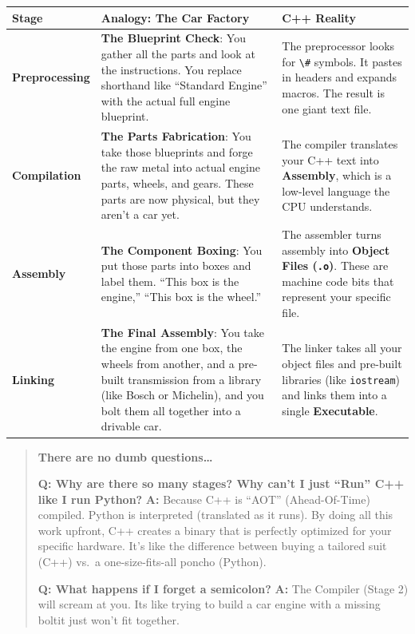 \begin{longtable}[]{@{}
  >{\raggedright\arraybackslash}p{}
  >{\raggedright\arraybackslash}p{}
  >{\raggedright\arraybackslash}p{}@{}}
\toprule
Stage & Analogy: The Car Factory & C++ Reality \\
\midrule
\endhead
\textbf{Preprocessing} & \textbf{The Blueprint Check}: You gather all
the parts and look at the instructions. You replace shorthand like
``Standard Engine'' with the actual full engine blueprint. & The
preprocessor looks for \passthrough{\lstinline!\#!} symbols. It pastes
in headers and expands macros. The result is one giant text file. \\
\textbf{Compilation} & \textbf{The Parts Fabrication}: You take those
blueprints and forge the raw metal into actual engine parts, wheels, and
gears. These parts are now physical, but they aren't a car yet. & The
compiler translates your C++ text into \textbf{Assembly}, which is a
low-level language the CPU understands. \\
\textbf{Assembly} & \textbf{The Component Boxing}: You put those parts
into boxes and label them. ``This box is the engine,'' ``This box is the
wheel.'' & The assembler turns assembly into \textbf{Object Files
(\passthrough{\lstinline!.o!})}. These are machine code bits that
represent your specific file. \\
\textbf{Linking} & \textbf{The Final Assembly}: You take the engine from
one box, the wheels from another, and a pre-built transmission from a
library (like Bosch or Michelin), and you bolt them all together into a
drivable car. & The linker takes all your object files and pre-built
libraries (like \passthrough{\lstinline!iostream!}) and links them into
a single \textbf{Executable}. \\
\bottomrule
\end{longtable}

\begin{quote}
\textbf{There are no dumb questions\ldots{}}

\textbf{Q: Why are there so many stages? Why can't I just ``Run'' C++
like I run Python?} \textbf{A:} Because C++ is ``AOT'' (Ahead-Of-Time)
compiled. Python is interpreted (translated as it runs). By doing all
this work upfront, C++ creates a binary that is perfectly optimized for
your specific hardware. It's like the difference between buying a
tailored suit (C++) vs.~a one-size-fits-all poncho (Python).

\textbf{Q: What happens if I forget a semicolon?} \textbf{A:} The
Compiler (Stage 2) will scream at you. Its like trying to build a car
engine with a missing boltit just won't fit together.
\end{quote}

